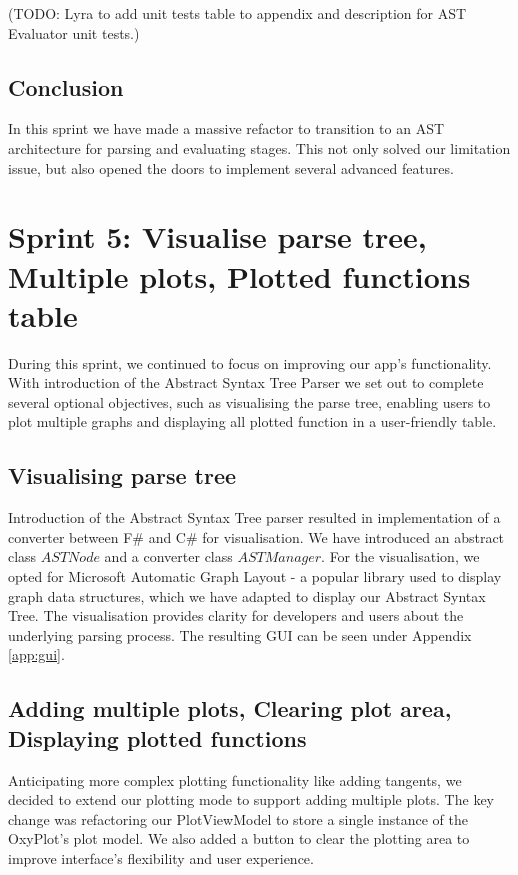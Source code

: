 \documentclass[a4paper, oneside, 11pt]{report}
\begin{document}
(TODO: Lyra to add unit tests table to appendix and description for AST Evaluator unit tests.)

\subsection{Conclusion}
In this sprint we have made a massive refactor to transition to an AST architecture for parsing and evaluating stages. This not only solved our limitation issue, but also opened the doors to implement several advanced features.

\section{Sprint 5: Visualise parse tree, Multiple plots, Plotted functions table}
During this sprint, we continued to focus on improving our app's functionality. With introduction of the Abstract Syntax Tree Parser we set out to complete several optional objectives, such as visualising the parse tree, enabling users to plot multiple graphs and displaying all plotted function in a user-friendly table.

\subsection{Visualising parse tree}
Introduction of the Abstract Syntax Tree parser resulted in implementation of a converter between F\# and C\# for visualisation. We have introduced an abstract class $ASTNode$ and a converter class $ASTManager$. For the visualisation, we opted for Microsoft Automatic Graph Layout\cite{MSAGL} - a popular library used to display graph data structures, which we have adapted to display our Abstract Syntax Tree. The visualisation provides clarity for developers and users about the underlying parsing process. The resulting GUI can be seen under Appendix \ref{app:gui}.

\subsection{Adding multiple plots, Clearing plot area, Displaying plotted functions}
Anticipating more complex plotting functionality like adding tangents, we decided to extend our plotting mode to support adding multiple plots. The key change was refactoring our PlotViewModel to store a single instance of the OxyPlot's plot model. We also added a button to clear the plotting area to improve interface's flexibility and user experience. 
\end{document}
